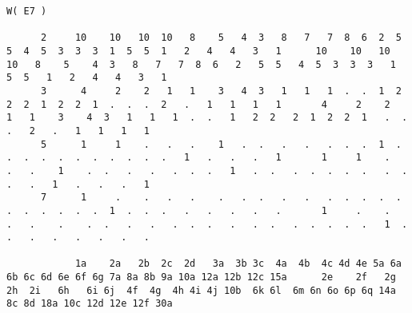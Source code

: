 
\usepackage{fullpage}


\tiny
\begin{verbatim}
W( E7 )

      2     10    10   10  10   8    5   4  3   8   7   7  8  6  2  5  5  4  5  3  3  3  1  5  5  1   2   4   4   3   1      10    10   10  10   8    5    4  3   8   7   7  8  6   2   5  5   4  5  3  3  3   1  5  5   1   2   4   4   3   1
      3      4     2    2   1   1    3   4  3   1   1   1  .  .  1  2  2  2  1  2  2  1  .  .  .  2   .   1   1   1   1       4     2    2   1   1    3    4  3   1   1   1  .  .   1   2  2   2  1  2  2  1   .  .  .   2   .   1   1   1   1
      5      1     1    .   .   .    1   .  .   .   .   .  .  .  1  .  .  .  .  .  .  .  .  .  .  .   1   .   .   .   1       1     1    .   .   .    1    .  .   .   .   .  .  .   1   .  .   .  .  .  .  .   .  .  .   .   1   .   .   .   1
      7      1     .    .   .   .    .   .  .   .   .   .  .  .  .  .  .  .  .  .  .  .  1  .  .  .   .   .   .   .   .       1     .    .   .   .    .    .  .   .   .   .  .  .   .   .  .   .  .  .  .  .   1  .  .   .   .   .   .   .   .

            1a    2a   2b  2c  2d   3a  3b 3c  4a  4b  4c 4d 4e 5a 6a 6b 6c 6d 6e 6f 6g 7a 8a 8b 9a 10a 12a 12b 12c 15a      2e    2f   2g  2h  2i   6h   6i 6j  4f  4g  4h 4i 4j 10b  6k 6l  6m 6n 6o 6p 6q 14a 8c 8d 18a 10c 12d 12e 12f 30a


\end{verbatim}
